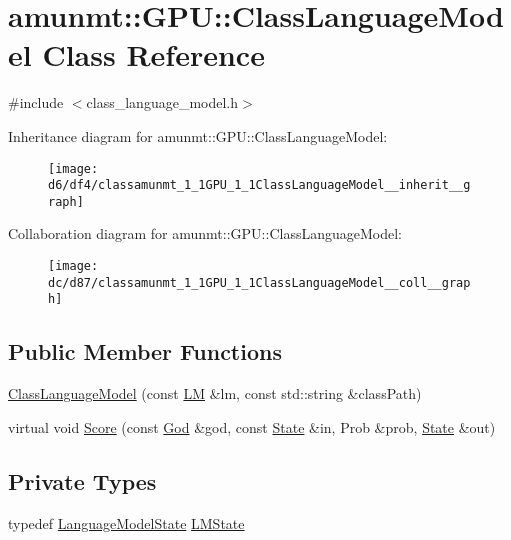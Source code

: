 \hypertarget{classamunmt_1_1GPU_1_1ClassLanguageModel}{}\section{amunmt\+:\+:G\+PU\+:\+:Class\+Language\+Model Class Reference}
\label{classamunmt_1_1GPU_1_1ClassLanguageModel}


{\ttfamily \#include $<$class\+\_\+language\+\_\+model.\+h$>$}



Inheritance diagram for amunmt\+:\+:G\+PU\+:\+:Class\+Language\+Model\+:
\nopagebreak
\begin{figure}[H]
\begin{center}
\leavevmode
\texttt{[image: d6/df4/classamunmt\_1\_1GPU\_1\_1ClassLanguageModel\_\_inherit\_\_graph]}
\end{center}
\end{figure}


Collaboration diagram for amunmt\+:\+:G\+PU\+:\+:Class\+Language\+Model\+:
\nopagebreak
\begin{figure}[H]
\begin{center}
\leavevmode
\texttt{[image: dc/d87/classamunmt\_1\_1GPU\_1\_1ClassLanguageModel\_\_coll\_\_graph]}
\end{center}
\end{figure}
\subsection*{Public Member Functions}
\begin{DoxyCompactItemize}
\item 
\hyperlink{classamunmt_1_1GPU_1_1ClassLanguageModel_aaaee32c80317f443104914d0079410d7}{Class\+Language\+Model} (const \hyperlink{classLM}{LM} \&lm, const std\+::string \&class\+Path)
\item 
virtual void \hyperlink{classamunmt_1_1GPU_1_1ClassLanguageModel_a0cbf0d5fec22724b1e8e33e4aa6f779c}{Score} (const \hyperlink{classamunmt_1_1God}{God} \&god, const \hyperlink{classamunmt_1_1State}{State} \&in, Prob \&prob, \hyperlink{classamunmt_1_1State}{State} \&out)
\end{DoxyCompactItemize}
\subsection*{Private Types}
\begin{DoxyCompactItemize}
\item 
typedef \hyperlink{classLanguageModelState}{Language\+Model\+State} \hyperlink{classamunmt_1_1GPU_1_1ClassLanguageModel_ae3570f0dd0a320300e83f2d282865640}{L\+M\+State}
\end{DoxyCompactItemize}
